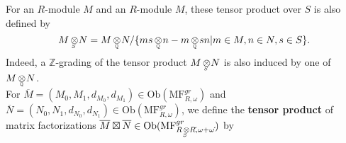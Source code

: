 \documentclass[10pt]{amsart}
\theoremstyle{break}
\begin{document}
For an $R$-module $M$ and an $R\acute{}$-module $M\acute{}$, these tensor product over $S$ is also defined by
\begin{equation*}
M{{\,\otimes\hspace{-0.7em}\raisebox{-0.5ex}{${}_{{}_{S}}$}\,}} N=M{{\,\otimes\hspace{-0.6em}\raisebox{-0.5ex}{${}_{{}_{{\mathbb{Q}}}}$}\,}} N/\{ms{{\,\otimes\hspace{-0.6em}\raisebox{-0.5ex}{${}_{{}_{{\mathbb{Q}}}}$}\,}} n-m{{\,\otimes\hspace{-0.6em}\raisebox{-0.5ex}{${}_{{}_{{\mathbb{Q}}}}$}\,}} sn|m\in M,n\in N,s\in S\}.
\end{equation*}
Indeed, a ${{\mathbb{Z}}}$-grading of the tensor product $M{{\,\otimes\hspace{-0.7em}\raisebox{-0.5ex}{${}_{{}_{S}}$}\,}} N$ is also induced by one of $M{{\,\otimes\hspace{-0.6em}\raisebox{-0.5ex}{${}_{{}_{{\mathbb{Q}}}}$}\,}} N$.\\
\indent
For $\overline{M}=(M_0,M_1,d_{M_0},d_{M_1}) \in {{\mathrm{Ob}}}({{\mathrm{MF}}}^{gr}_{R,\omega})$ and $\overline{N}=(N_0,N_1,d_{N_0},d_{N_1}) \in {{\mathrm{Ob}}}({{\mathrm{MF}}}^{gr}_{R\acute{},\omega\acute{}})$, 
we define the {\bf tensor product} of matrix factorizations $\overline{M}\boxtimes \overline{N} \in {{\mathrm{Ob}}}({{\mathrm{MF}}}^{gr}_{R{{\,\otimes\hspace{-0.7em}\raisebox{-0.5ex}{${}_{{}_{S}}$}\,}} R\acute{},\omega + \omega \acute{}})$ by
\end{document}
